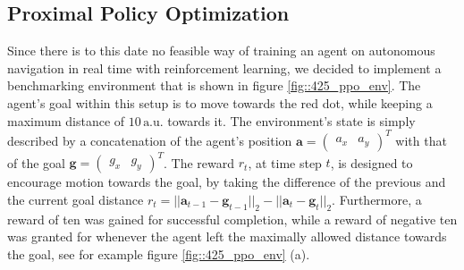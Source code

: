 \subsection{Proximal Policy Optimization}
\label{sec::425_pp}
Since there is to this date no feasible way of training an agent on autonomous navigation in real time with reinforcement learning, we decided to implement a benchmarking environment that is shown in figure \ref{fig::425_ppo_env}. The agent's goal within this setup is to move towards the red dot, while keeping a maximum distance of $10\,\text{a.u.}$ towards it. The environment's state is simply described by a concatenation of the agent's position $\bm{a} = \begin{pmatrix}
a_x & a_y
\end{pmatrix}^T$ with that of the goal $\bm{g} = \begin{pmatrix}
g_x & g_y
\end{pmatrix}^T$. The reward $r_t$, at time step $t$, is designed to encourage motion towards the goal, by taking the difference of the previous and the current goal distance $r_t = ||\bm{a}_{t-1}-\bm{g}_{t-1}||_2 - ||\bm{a}_{t}-\bm{g}_{t}||_2$. Furthermore, a reward of ten was gained for successful completion, while a reward of negative ten was granted for whenever the agent left the maximally allowed distance towards the goal, see for example figure \ref{fig::425_ppo_env} (a).
